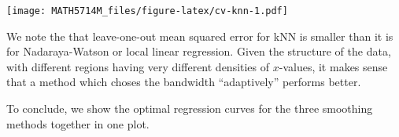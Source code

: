 \documentclass[
  a4paper,
]{article}
\newenvironment{Shaded}{\begin{snugshade}}{\end{snugshade}}
\newcommand{\AttributeTok}[1]{\textcolor[rgb]{0.77,0.63,0.00}{#1}}
\newcommand{\ControlFlowTok}[1]{\textcolor[rgb]{0.13,0.29,0.53}{\textbf{#1}}}
\newcommand{\DecValTok}[1]{\textcolor[rgb]{0.00,0.00,0.81}{#1}}
\newcommand{\FunctionTok}[1]{\textcolor[rgb]{0.00,0.00,0.00}{#1}}
\newcommand{\NormalTok}[1]{#1}
\newcommand{\OtherTok}[1]{\textcolor[rgb]{0.56,0.35,0.01}{#1}}
\newcommand{\SpecialCharTok}[1]{\textcolor[rgb]{0.00,0.00,0.00}{#1}}
\newcommand{\StringTok}[1]{\textcolor[rgb]{0.31,0.60,0.02}{#1}}
\theoremstyle{definition}
\theoremstyle{definition}
\theoremstyle{definition}
\theoremstyle{definition}
\theoremstyle{remark}
\begin{document}
\begin{Shaded}
\end{Shaded}

\texttt{[image: MATH5714M\_files/figure-latex/cv-knn-1.pdf]}

We note the that leave-one-out mean squared error for kNN is smaller
than it is for Nadaraya-Watson or local linear regression. Given
the structure of the data, with different regions having very different
densities of \(x\)-values, it makes sense that a method which choses
the bandwidth ``adaptively'' performs better.

To conclude, we show the optimal regression curves for the three smoothing
methods together in one plot.
\end{document}
